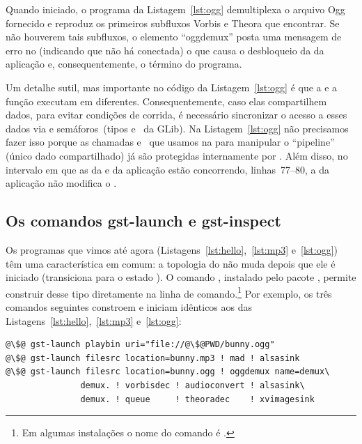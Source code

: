 \documentclass{SBCbookchapter}
\begin{document}
Quando iniciado, o programa da Listagem~\ref{lst:ogg} demultiplexa o arquivo
Ogg fornecido e reproduz os primeiros subfluxos Vorbis e Theora que
encontrar.  Se não houverem tais subfluxos, o elemento ``oggdemux'' posta
uma mensagem de erro no  (indicando que não há 
conectada) o que causa o desbloqueio da  da aplicação e,
consequentemente, o término do programa.

Um detalhe sutil, mas importante no código da Listagem~\ref{lst:ogg} é que a
  e a função  executam em 
diferentes.  Consequentemente, caso elas compartilhem dados, para evitar
condições de corrida, é necessário sincronizar o acesso a esses dados via
 e semáforos~(tipos  e~ da GLib).  Na
Listagem~\ref{lst:ogg} não precisamos fazer isso porque as chamadas
 e~ que usamos na  para
manipular o ``pipeline'' (único dado compartilhado) já são protegidas
internamente por .  Além disso, no intervalo em que as
 da  e da aplicação estão concorrendo,
linhas~77--80, a  da aplicação não modifica o .


\subsection*{Os comandos gst-launch e gst-inspect}

Os programas que vimos até agora (Listagens~\ref{lst:hello},~\ref{lst:mp3}
e~\ref{lst:ogg}) têm uma característica em comum: a topologia do
 não muda depois que ele é iniciado (transiciona para o estado
).  O comando , instalado pelo pacote
, permite construir  desse tipo diretamente na
linha de comando.\footnote{Em algumas instalações o nome do comando é
  .}  Por exemplo, os três comandos seguintes constroem e
iniciam  idênticos aos das
Listagens~\ref{lst:hello},~\ref{lst:mp3} e~\ref{lst:ogg}:
\begin{lstlisting}[style=command]
@\$@ gst-launch playbin uri="file://@\$@PWD/bunny.ogg"
@\$@ gst-launch filesrc location=bunny.mp3 ! mad ! alsasink
@\$@ gst-launch filesrc location=bunny.ogg ! oggdemux name=demux\
               demux. ! vorbisdec ! audioconvert ! alsasink\
               demux. ! queue     ! theoradec    ! xvimagesink
\end{lstlisting}
\end{document}
